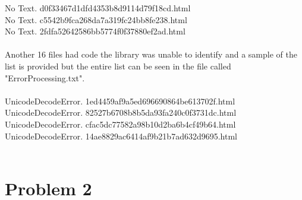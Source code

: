 \documentclass[10pt,letterpaper]{article}
\begin{document}
No Text. d0f33467d1dfd4353b8d9114d79f18cd.html\\
No Text. c5542b9fca268da7a319fc24bb8fe238.html\\
No Text. 2fdfa52642586bb5774f0f37880ef2ad.html\\
\\
Another 16 files had code the library was unable to identify and a sample of the list is provided but the entire list can be seen in the file called "ErrorProcessing.txt".\\
\\
UnicodeDecodeError. 1ed4459af9a5ed696690864be613702f.html\\
UnicodeDecodeError. 82527b6708b8b5da93fa240c0f3731dc.html\\
UnicodeDecodeError. cfac5dc77582a98b10d2ba6b4cf49b64.html\\
UnicodeDecodeError. 14ae8829ac6414af9b21b7ad632d9695.html\\
\\
\pagebreak 

\section{Problem 2}
\end{document}
